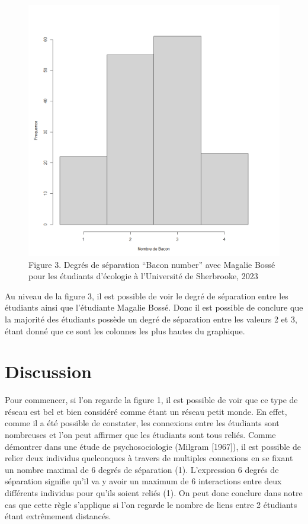 \documentclass[
]{article}
\begin{document}
\begin{figure}
\centering
\includegraphics[width=5.20833in,height=\textheight]{images/b_number.png}
\caption{Figure 3. Degrés de séparation ``Bacon number'' avec Magalie
Bossé pour les étudiants d'écologie à l'Université de Sherbrooke, 2023}
\end{figure}

Au niveau de la figure 3, il est possible de voir le degré de séparation
entre les étudiants ainsi que l'étudiante Magalie Bossé. Donc il est
possible de conclure que la majorité des étudiants possède un degré de
séparation entre les valeurs 2 et 3, étant donné que ce sont les
colonnes les plus hautes du graphique.

\hypertarget{discussion}{%
\section{Discussion}\label{discussion}}

Pour commencer, si l'on regarde la figure 1, il est possible de voir que
ce type de réseau est bel et bien considéré comme étant un réseau petit
monde. En effet, comme il a été possible de constater, les connexions
entre les étudiants sont nombreuses et l'on peut affirmer que les
étudiants sont tous reliés. Comme démontrer dans une étude de
psychosociologie (Milgram {[}1967{]}), il est possible de relier deux
individus quelconques à travers de multiples connexions en se fixant un
nombre maximal de 6 degrés de séparation (1). L'expression 6 degrés de
séparation signifie qu'il va y avoir un maximum de 6 interactions entre
deux différents individus pour qu'ils soient reliés (1). On peut donc
conclure dans notre cas que cette règle s'applique si l'on regarde le
nombre de liens entre 2 étudiants étant extrêmement distancés.
\end{document}
